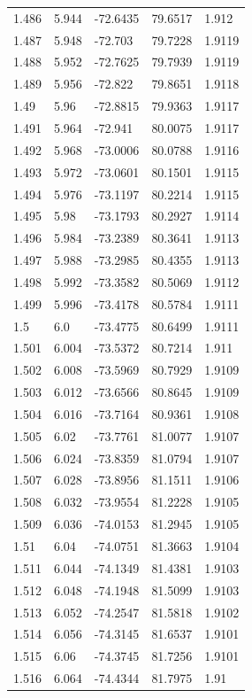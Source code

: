 \begin{tabular}{lllll}
1.486 & 5.944 & -72.6435 & 79.6517 & 1.912 \\
1.487 & 5.948 & -72.703 & 79.7228 & 1.9119 \\
1.488 & 5.952 & -72.7625 & 79.7939 & 1.9119 \\
1.489 & 5.956 & -72.822 & 79.8651 & 1.9118 \\
1.49 & 5.96 & -72.8815 & 79.9363 & 1.9117 \\
1.491 & 5.964 & -72.941 & 80.0075 & 1.9117 \\
1.492 & 5.968 & -73.0006 & 80.0788 & 1.9116 \\
1.493 & 5.972 & -73.0601 & 80.1501 & 1.9115 \\
1.494 & 5.976 & -73.1197 & 80.2214 & 1.9115 \\
1.495 & 5.98 & -73.1793 & 80.2927 & 1.9114 \\
1.496 & 5.984 & -73.2389 & 80.3641 & 1.9113 \\
1.497 & 5.988 & -73.2985 & 80.4355 & 1.9113 \\
1.498 & 5.992 & -73.3582 & 80.5069 & 1.9112 \\
1.499 & 5.996 & -73.4178 & 80.5784 & 1.9111 \\
1.5 & 6.0 & -73.4775 & 80.6499 & 1.9111 \\
1.501 & 6.004 & -73.5372 & 80.7214 & 1.911 \\
1.502 & 6.008 & -73.5969 & 80.7929 & 1.9109 \\
1.503 & 6.012 & -73.6566 & 80.8645 & 1.9109 \\
1.504 & 6.016 & -73.7164 & 80.9361 & 1.9108 \\
1.505 & 6.02 & -73.7761 & 81.0077 & 1.9107 \\
1.506 & 6.024 & -73.8359 & 81.0794 & 1.9107 \\
1.507 & 6.028 & -73.8956 & 81.1511 & 1.9106 \\
1.508 & 6.032 & -73.9554 & 81.2228 & 1.9105 \\
1.509 & 6.036 & -74.0153 & 81.2945 & 1.9105 \\
1.51 & 6.04 & -74.0751 & 81.3663 & 1.9104 \\
1.511 & 6.044 & -74.1349 & 81.4381 & 1.9103 \\
1.512 & 6.048 & -74.1948 & 81.5099 & 1.9103 \\
1.513 & 6.052 & -74.2547 & 81.5818 & 1.9102 \\
1.514 & 6.056 & -74.3145 & 81.6537 & 1.9101 \\
1.515 & 6.06 & -74.3745 & 81.7256 & 1.9101 \\
1.516 & 6.064 & -74.4344 & 81.7975 & 1.91 \\

\end{tabular}

